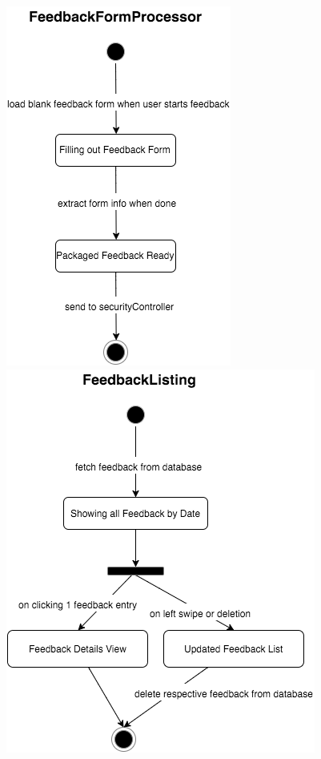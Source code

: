 \documentclass[12pt]{article}
\begin{document}
\includegraphics[scale=0.5]{feedbackFormProcessor-sd.png}\\
\includegraphics[scale=0.5]{feedbackListing-sd.png}\\
\end{document}

